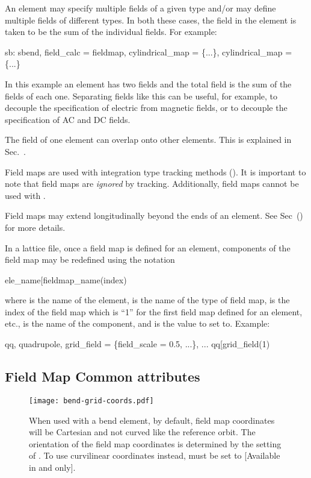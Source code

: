 An element may specify multiple fields of a given type and/or may define multiple fields
of different types. In both these cases, the field in the element is taken to be the sum
of the individual fields. For example:
\begin{example}
  sb: sbend, field_calc = fieldmap, cylindrical_map = \{...\},  cylindrical_map = \{...\}
\end{example}
In this example an element has two  fields and the total field is the
sum of the fields of each one. Separating fields like this can be useful, for example, to
decouple the specification of electric from magnetic fields, or to decouple the
specification of AC and DC fields.

The field of one element can overlap onto other elements. This is explained in
Sec.~.

Field maps are used with integration type tracking methods ().  It is important to
note that field maps are {\em ignored} by  tracking. Additionally, 
field maps cannot be used with .

Field maps may extend longitudinally beyond the ends of an element. See Sec~() for
more details.

In a lattice file, once a field map is defined for an element, components of the field map
may be redefined using the notation
\begin{example}
  ele_name[fieldmap_name(index)%
\end{example}
where  is the name of the element,  is the name of the
type of field map,  is the index of the field map which is ``1'' for the first
field map defined for an element, etc.,  is the name of the component,
and  is the value to set to. Example:
\begin{example}
  qq, quadrupole, grid_field = \{field_scale = 0.5, ...\}, ...
  qq[grid_field(1)%
\end{example}

\subsection{Field Map Common attributes}
\label{s:fieldmap.com}

\begin{figure}[tb]
  \centering
  \texttt{[image: bend-grid-coords.pdf]}
  \caption[ coordinates when used with a bend element.]{
When used with a bend element, by default, field map coordinates will be Cartesian and not curved
like the reference orbit. The orientation of the field map coordinates is determined by the setting
of . To use curvilinear coordinates instead,  must be set to
 [Available in  and  only].}
  \label{f:bend.grid}
\end{figure}

